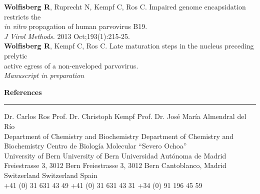 \begin{addmargin}{0.025\textwidth}
\textbf{Wolfisberg R}, Ruprecht N, Kempf C, Ros C. Impaired genome encapsidation
restricts the \\
\textit{in vitro} propagation of human parvovirus B19. \\
\textit{J Virol Methods.} 2013 Oct;193(1):215-25. \\[0.3 cm]

\textbf{Wolfisberg R}, Kempf C, Ros C. Late maturation steps in the nucleus preceding prelytic\\
 active egress of a non-enveloped parvovirus.\\ 
 \textit{Manuscript in preparation}
\end{addmargin}

\vspace{0.5 cm}
\large
\textbf{References}
\noindent\rule[3mm]{\linewidth}{1pt}

\begin{tiny} 
\vspace{-0.4cm}
\begin{tabbing}
Dr. Carlos Ros \hspace{3.5 cm} \= Prof. Dr. Christoph Kempf \hspace{2 cm} \= Prof. Dr. José María Almendral del Río \\
Department of Chemistry and Biochemistry \> Department of Chemistry and Biochemistry \> Centro de Biología Molecular ``Severo Ochoa''  \\
University of Bern \> University of Bern \> Universidad Autónoma de Madrid \\
Freiestrasse 3, 3012 Bern \> Freiestrasse 3, 3012 Bern \> Cantoblanco,  Madrid \\
Switzerland \> Switzerland \> Spain  \\ [0.1 cm]
+41 (0) 31 631 43 49 \> +41 (0) 31 631 43 31 \> +34 (0) 91 196 45 59
 \end{tabbing}
\end{tiny}